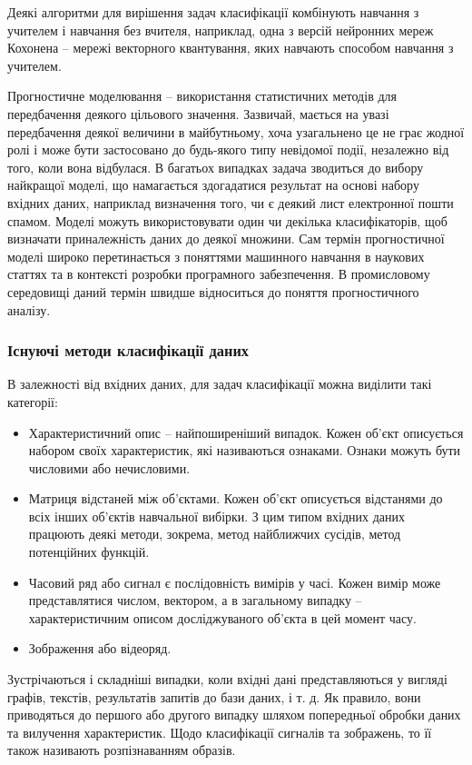 Деякі алгоритми для вирішення задач класифікації комбінують навчання з учителем і навчання без вчителя, наприклад, одна з версій нейронних мереж Кохонена – мережі векторного квантування, яких навчають способом навчання з учителем.

Прогностичне моделювання – використання статистичних методів для передбачення деякого цільового значення. Зазвичай, мається на увазі передбачення деякої величини в майбутньому, хоча узагальнено це не грає жодної ролі і може бути застосовано до будь-якого типу невідомої події, незалежно від того, коли вона відбулася.
В багатьох випадках задача зводиться до вибору найкращої моделі, що намагається здогадатися результат на основі набору вхідних даних, наприклад визначення того, чи є деякий лист електронної пошти спамом. Моделі можуть використовувати один чи декілька класифікаторів, щоб визначати приналежність даних до деякої множини. Сам термін прогностичної моделі широко перетинається з поняттями машинного навчання в наукових статтях та в контексті розробки програмного забезпечення. В промисловому середовищі даний термін швидше відноситься до поняття прогностичного аналізу.

\subsubsection{Існуючі методи класифікації даних}
В залежності від вхідних даних, для задач класифікації можна виділити такі категорії:

\begin{itemize}  
	\item Характеристичний опис – найпоширеніший випадок. Кожен об'єкт описується набором своїх характеристик, які називаються ознаками. Ознаки можуть бути числовими або нечисловими.
	\item Матриця відстаней між об'єктами. Кожен об'єкт описується відстанями до всіх інших об'єктів навчальної вибірки. З цим типом вхідних даних працюють деякі методи, зокрема, метод найближчих сусідів, метод потенційних функцій.
	\item Часовий ряд або сигнал є послідовність вимірів у часі. Кожен вимір може представлятися числом, вектором, а в загальному випадку – характеристичним описом досліджуваного об'єкта в цей момент часу.
	\item Зображення або відеоряд.
\end{itemize}

Зустрічаються і складніші випадки, коли вхідні дані представляються у вигляді графів, текстів, результатів запитів до бази даних, і т. д. Як правило, вони приводяться до першого або другого випадку шляхом попередньої обробки даних та вилучення характеристик. Щодо класифікації сигналів та зображень, то її також називають розпізнаванням образів.

